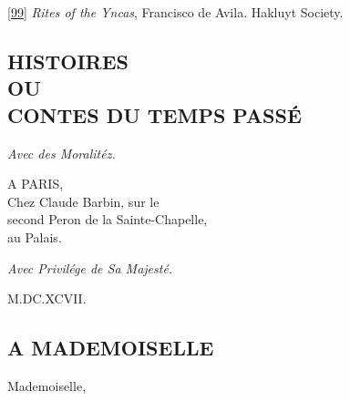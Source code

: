 \documentclass[14pt,a4paper]{memoir}
\begin{document}
\protect\hypertarget{4533318093929944247_33931-h-1.htm.xhtmlux5cux23Footnote_99}{}{}\protect\hyperlink{4533318093929944247_33931-h-1.htm.xhtmlux5cux23FNanchor_99}{{{[}99{]}}}
\emph{Rites of the Yncas}, Francisco de Avila. Hakluyt Society.

\newpage

\protect\hypertarget{4533318093929944247_33931-h-2.htm.xhtml}{}{}

\hypertarget{4533318093929944247_33931-h-2.htm.xhtmlux5cux23pgepubid00012}{}
\begin{otherlanguage}{french}

\chapter*{HISTOIRES \\ OU \\ CONTES DU TEMPS PASSÉ}

\emph{Avec des Moralitéz.}

A PARIS,\\
Chez {Claude Barbin}, sur le\\
second Peron de la Sainte-Chapelle,\\
au Palais.

\emph{Avec Privilége de Sa Majesté.}

M.DC.XCVII.

\section{A MADEMOISELLE}

{Mademoiselle},


\end{otherlanguage}
\end{document}

